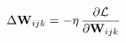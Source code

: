 \documentclass[preview]{standalone}
\begin{document}
\begin{align*}
\special{dvisvgm:raw <g id='unique000'>}\Delta \mathbf{W}_{ijk} = -\eta \, \frac{\partial \mathcal{L}}{\partial \mathbf{W}_{ijk}}\special{dvisvgm:raw </g>}
\end{align*}
\end{document}
